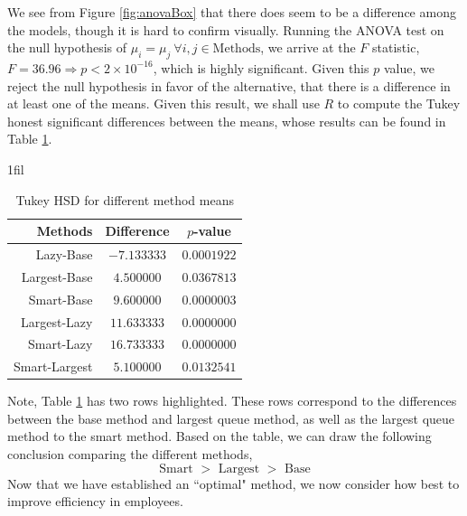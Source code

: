 \documentclass[10pt]{report}            %
\makeatletter
\newcommand*{\centerfloat}{%
  \parindent \z@
  \leftskip \z@ \@plus 1fil \@minus \textwidth
  \rightskip\leftskip
  \parfillskip \z@skip}
\makeatother
\begin{document}
We see from Figure \ref{fig:anovaBox} that there does seem to be a difference among the models, though it is hard to confirm visually. Running the ANOVA test on the null hypothesis of $\mu_i=\mu_j\ \forall i,j\in\text{Methods}$, we arrive at the $F$ statistic, $F=36.96\Rightarrow p<2\times10^{-16}$, which is highly significant. Given this $p$ value, we reject the null hypothesis in favor of the alternative, that there is a difference in at least one of the means. Given this result, we shall use $R$ to compute the Tukey honest significant differences between the means, whose results can be found in Table \ref{table:tukey}.
\begin{table}[H]
\centerfloat
\begin{tabular}{|r||c|c|}
\hline
Methods & Difference & $p$-value\\\hline\hline
Lazy-Base   &  $-7.133333$ & $0.0001922$\\\hline
\cellcolor{yellow!25}Largest-Base  & \cellcolor{yellow!25}$4.500000$ & \cellcolor{yellow!25}$0.0367813$\\\hline
Smart-Base  &   $9.600000$ & $0.0000003$\\\hline
Largest-Lazy & $11.633333$ & $0.0000000$\\\hline
Smart-Lazy  &  $16.733333$ & $0.0000000$\\\hline
\cellcolor{yellow!25}Smart-Largest & \cellcolor{yellow!25}$5.100000$ & \cellcolor{yellow!25}$0.0132541$\\\hline
\end{tabular}
\caption{Tukey HSD for different method means}
\label{table:tukey}
\end{table}
Note, Table \ref{table:tukey} has two rows highlighted. These rows correspond to the differences between the base method and largest queue method, as well as the largest queue method to the smart method. Based on the table, we can draw the following conclusion comparing the different methods,
\[\text{Smart $>$ Largest $>$ Base}\]
Now that we have established an ``optimal" method, we now consider how best to improve efficiency in employees.
\end{document}
